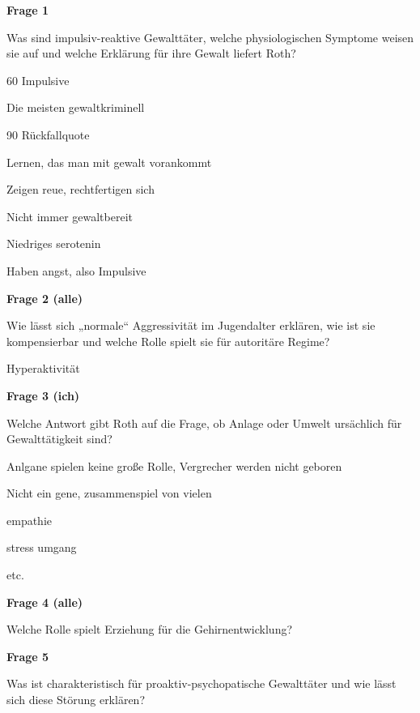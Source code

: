 \startsection[title={2024-08-26 - Gibt es geborene
Verbrechen?},reference={2024-08-26-Gibt es geborene Verbrechen?}]

\startsectionlevel[title={Video},reference={video}]

\startframedtask
{\bf Frage 1}

Was sind impulsiv-reaktive Gewalttäter, welche physiologischen Symptome
weisen sie auf und welche Erklärung für ihre Gewalt liefert Roth?

\stopframedtask

\startitemize[packed]
\item
  60 Impulsive
\item
  Die meisten gewaltkriminell
\item
  90 Rückfallquote
\item
  Lernen, das man mit gewalt vorankommt
\item
  Zeigen reue, rechtfertigen sich
\item
  Nicht immer gewaltbereit
\item
  Niedriges serotenin
\item
  Haben angst, also Impulsive
\stopitemize

\startframedtask
{\bf Frage 2 (alle)}

Wie lässt sich „normale“ Aggressivität im Jugendalter erklären, wie ist
sie kompensierbar und welche Rolle spielt sie für autoritäre Regime?

\stopframedtask

\startitemize[packed]
\item
  Hyperaktivität
\stopitemize

\startframedtask
{\bf Frage 3 (ich)}

Welche Antwort gibt Roth auf die Frage, ob Anlage oder Umwelt ursächlich
für Gewalttätigkeit sind?

\stopframedtask

\startitemize[packed]
\item
  Anlgane spielen keine große Rolle, Vergrecher werden nicht geboren
\item
  Nicht ein gene, zusammenspiel von vielen
  \startitemize[packed]
  \item
    empathie
  \item
    stress umgang
  \item
    etc.
  \stopitemize
\stopitemize

\startframedtask
{\bf Frage 4 (alle)}

Welche Rolle spielt Erziehung für die Gehirnentwicklung?

\stopframedtask

\startframedtask
{\bf Frage 5}

Was ist charakteristisch für proaktiv-psychopatische Gewalttäter und wie
lässt sich diese Störung erklären?

\stopframedtask

\stopsectionlevel

\stopsection
